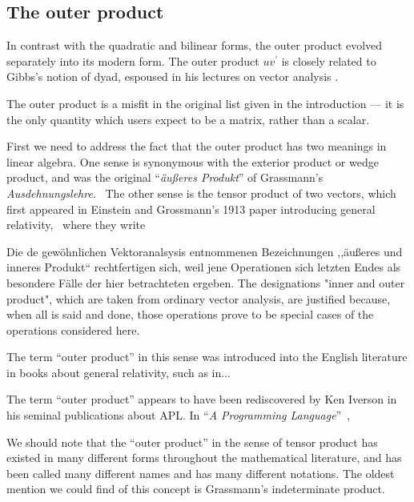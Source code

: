 \subsection{The outer product}


In contrast with the quadratic and bilinear forms, the outer product evolved separately into its modern form. The outer product $u v^\prime$ is closely related to Gibbs's notion of dyad, espoused in his lectures on vector analysis \cite{Gibbs1881,Wilson1901}.

The outer product is a misfit in the original list given in the introduction --- it is the only quantity which users expect to be a matrix, rather than a scalar.

First we need to address the fact that the outer product has two meanings in linear algebra. One sense is synonymous with the exterior product or wedge product, and was the original ``\textit{äußeres Produkt}'' of Grassmann's \textit{Ausdehnungslehre}.~\cite{Grassmann1844,Grassmann1862,Grassmann1995,Grassmann2000} The other sense is the tensor product of two vectors, which first appeared in Einstein and Grossmann's 1913 paper introducing general relativity,~\cite{Einstein1913} where they write

Die de gewöhnlichen Vektoranalsysis entnommenen Bezeichnungen ,,äußeres und inneres Produkt`` rechtfertigen sich, weil jene Operationen sich letzten Endes als besondere Fälle der hier betrachteten ergeben. The designations "inner and outer product", which are taken from ordinary vector analysis, are justified because, when all is said and done, those operations prove to be special cases of the operations considered here.~\cite[T. II, p. 26]{Einstein1913,Einstein1996}



The term ``outer product'' in this sense was introduced into the English literature in books about general relativity, such as in...

The term ``outer product'' appears to have been rediscovered by Ken Iverson in his seminal publications about APL. In ``\textit{A Programming Language}''~\cite{Iverson1962book},

We should note that the ``outer product'' in the sense of tensor product has existed in many different forms throughout the mathematical literature, and has been called many different names and has many different notations. The oldest mention we could find of this concept is Grassmann's indeterminate product.

